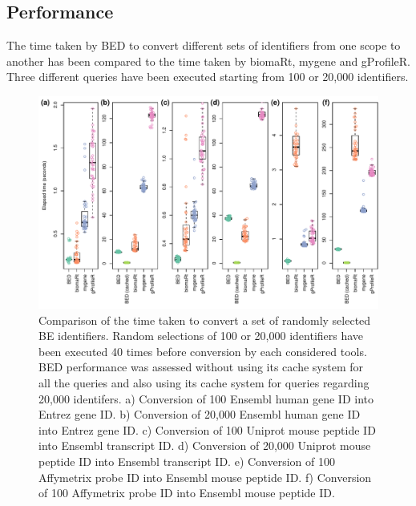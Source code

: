 \documentclass[9pt,a4paper,]{extarticle}
\theoremstyle{definition}
\theoremstyle{definition}
\theoremstyle{definition}
\theoremstyle{remark}
\begin{document}
\subsection{Performance}\label{performance}

The time taken by BED to convert different sets of identifiers from one scope
to another has been compared to the time taken by biomaRt, mygene and gProfileR.
Three different queries have been executed
starting from 100 or 20,000 identifiers.

\begin{figure}

{\centering \includegraphics[width=1\linewidth]{BED-F1000-Article_files/figure-latex/perf-1} 

}

\caption{Comparison of the time taken to convert a set of randomly selected BE identifiers. Random selections of 100 or 20,000 identifiers have been executed 40 times before conversion by each considered tools. BED performance was assessed without using its cache system for all the queries and also using its cache system for queries regarding 20,000 identifers. a) Conversion of 100 Ensembl human gene ID into Entrez gene ID. b) Conversion of 20,000 Ensembl human gene ID into Entrez gene ID. c) Conversion of 100 Uniprot mouse peptide ID into Ensembl transcript ID. d) Conversion of 20,000 Uniprot mouse peptide ID into Ensembl transcript ID. e) Conversion of 100 Affymetrix probe ID into Ensembl mouse peptide ID. f) Conversion of 100 Affymetrix probe ID into Ensembl mouse peptide ID.}\label{fig:perf}
\end{figure}
\end{document}
